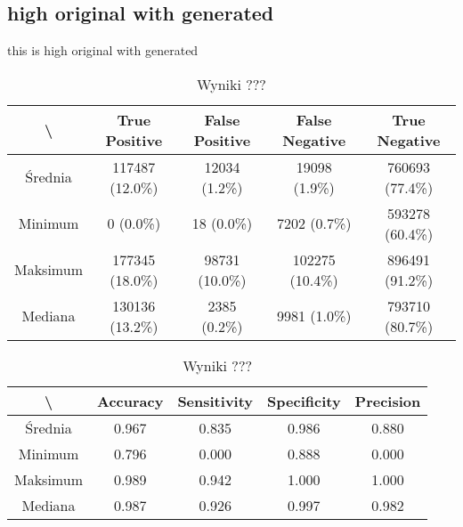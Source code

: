 \subsection{high original with generated}
this is high original with generated

\begin{table}[H]
	\centering
	\caption{Wyniki ???}
	\vspace{6pt}
	{\footnotesize
    \begin{tabular}{|c|c|c|c|c|}
      \hline \textbackslash & True Positive & False Positive & False Negative & True Negative \\
      \hline Średnia & 117487 (12.0\%) & 12034 (1.2\%) & 19098 (1.9\%) & 760693 (77.4\%) \\
      \hline Minimum & 0 (0.0\%) & 18 (0.0\%) & 7202 (0.7\%) & 593278 (60.4\%) \\
      \hline Maksimum & 177345 (18.0\%) & 98731 (10.0\%) & 102275 (10.4\%) & 896491 (91.2\%) \\
      \hline Mediana & 130136 (13.2\%) & 2385 (0.2\%) & 9981 (1.0\%) & 793710 (80.7\%) \\
      \hline
		\end{tabular}
	}
	\vspace{0pt}
\end{table}


\begin{table}[H]
	\centering
	\caption{Wyniki ???}
	\vspace{6pt}
	{\footnotesize
		\begin{tabular}{|c|c|c|c|c|}
      \hline \textbackslash & Accuracy & Sensitivity & Specificity & Precision \\
      \hline Średnia & 0.967 & 0.835 & 0.986 & 0.880 \\
      \hline Minimum & 0.796 & 0.000 & 0.888 & 0.000 \\
      \hline Maksimum & 0.989 & 0.942 & 1.000 & 1.000 \\
      \hline Mediana & 0.987 & 0.926 & 0.997 & 0.982 \\
      \hline
		\end{tabular}
	}
	\vspace{0pt}
\end{table}



